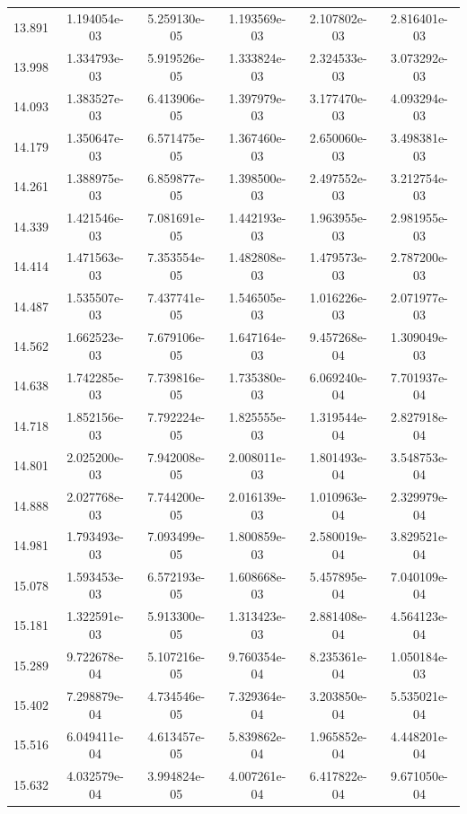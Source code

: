 \documentclass[fleqn,usenatbib]{mnras}
\begin{document}
\begin{table}
\begin{tabular}{c|cc|ccc}
        13.891 & 1.194054e-03 & 5.259130e-05 & 1.193569e-03 & 2.107802e-03 & 2.816401e-03 \\ 
        13.998 & 1.334793e-03 & 5.919526e-05 & 1.333824e-03 & 2.324533e-03 & 3.073292e-03 \\ 
        14.093 & 1.383527e-03 & 6.413906e-05 & 1.397979e-03 & 3.177470e-03 & 4.093294e-03 \\ \hline
        14.179 & 1.350647e-03 & 6.571475e-05 & 1.367460e-03 & 2.650060e-03 & 3.498381e-03 \\ 
        14.261 & 1.388975e-03 & 6.859877e-05 & 1.398500e-03 & 2.497552e-03 & 3.212754e-03 \\ 
        14.339 & 1.421546e-03 & 7.081691e-05 & 1.442193e-03 & 1.963955e-03 & 2.981955e-03 \\ 
        14.414 & 1.471563e-03 & 7.353554e-05 & 1.482808e-03 & 1.479573e-03 & 2.787200e-03 \\ 
        14.487 & 1.535507e-03 & 7.437741e-05 & 1.546505e-03 & 1.016226e-03 & 2.071977e-03 \\ \hline
        14.562 & 1.662523e-03 & 7.679106e-05 & 1.647164e-03 & 9.457268e-04 & 1.309049e-03 \\ 
        14.638 & 1.742285e-03 & 7.739816e-05 & 1.735380e-03 & 6.069240e-04 & 7.701937e-04 \\ 
        14.718 & 1.852156e-03 & 7.792224e-05 & 1.825555e-03 & 1.319544e-04 & 2.827918e-04 \\ 
        14.801 & 2.025200e-03 & 7.942008e-05 & 2.008011e-03 & 1.801493e-04 & 3.548753e-04 \\ 
        14.888 & 2.027768e-03 & 7.744200e-05 & 2.016139e-03 & 1.010963e-04 & 2.329979e-04 \\ \hline
        14.981 & 1.793493e-03 & 7.093499e-05 & 1.800859e-03 & 2.580019e-04 & 3.829521e-04 \\ 
        15.078 & 1.593453e-03 & 6.572193e-05 & 1.608668e-03 & 5.457895e-04 & 7.040109e-04 \\ 
        15.181 & 1.322591e-03 & 5.913300e-05 & 1.313423e-03 & 2.881408e-04 & 4.564123e-04 \\ 
        15.289 & 9.722678e-04 & 5.107216e-05 & 9.760354e-04 & 8.235361e-04 & 1.050184e-03 \\ 
        15.402 & 7.298879e-04 & 4.734546e-05 & 7.329364e-04 & 3.203850e-04 & 5.535021e-04 \\ \hline
        15.516 & 6.049411e-04 & 4.613457e-05 & 5.839862e-04 & 1.965852e-04 & 4.448201e-04 \\ 
        15.632 & 4.032579e-04 & 3.994824e-05 & 4.007261e-04 & 6.417822e-04 & 9.671050e-04 \\ 

\end{tabular}
\end{table}
\end{document}
